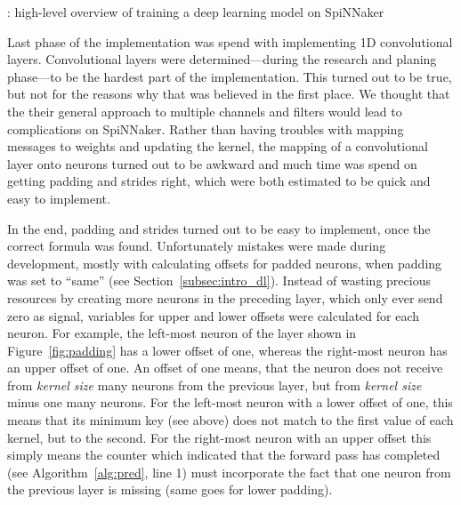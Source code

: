 \documentclass[]{article}
\begin{document}
\begin{algorithm} %
  \caption{: high-level overview of training a deep learning model on
    SpiNNaker}
  \label{alg:backprop}

  \begin{algorithmic}[1]
        \ENDIF
        \ENDIF
      \ENDFOR
    \ENDFOR
  \end{algorithmic}
\end{algorithm} %

Last phase of the implementation was spend with implementing 1D
convolutional layers.
Convolutional layers were determined---during the research and planing
phase---to be the hardest part of the implementation.
This turned out to be true, but not for the reasons why that was
believed in the first place.
We thought that the their general approach to multiple channels and
filters would lead to complications on SpiNNaker.
Rather than having troubles with mapping messages to weights and
updating the kernel, the mapping of a convolutional layer onto neurons
turned out to be awkward and much time was spend on getting padding
and strides right, which were both estimated to be quick and easy to
implement.

In the end, padding and strides turned out to be easy to implement,
once the correct formula was found.
Unfortunately mistakes were made during development, mostly with
calculating offsets for padded neurons, when padding was set to
``same'' (see Section~\ref{subsec:intro_dl}).
Instead of wasting precious resources by creating more neurons in
the preceding layer, which only ever send zero as signal, variables
for upper and lower offsets were calculated for each neuron.
For example, the left-most neuron of the layer shown in
Figure~\ref{fig:padding} has a lower offset of one, whereas the
right-most neuron has an upper offset of one.
An offset of one means, that the neuron does not receive
from \textit{kernel size} many neurons from the previous layer, but
from \textit{kernel size} minus one many neurons.
For the left-most neuron with a lower offset of one, this means that
its minimum key (see above) does not match to the first
value of each kernel, but to the second.
For the right-most neuron with an upper offset this simply means the
counter which indicated that the forward pass has completed
(see Algorithm~\ref{alg:pred}, line 1) must incorporate the fact
that one neuron from the previous layer is missing (same goes for
lower padding).
\end{document}
